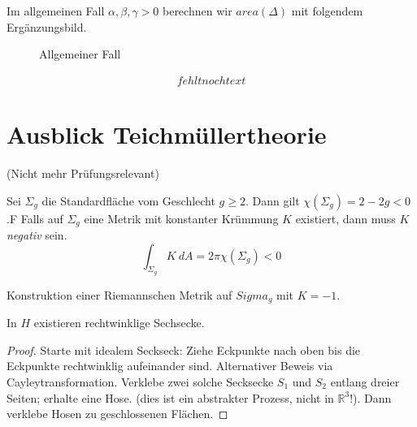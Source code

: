 \documentclass[../main.tex]{subfiles}
\begin{document}
Im allgemeinen Fall $\alpha, \beta, \gamma >0$ berechnen wir $area(\Delta)$ mit folgendem Ergänzungsbild.

\begin{figure}[htb]
    \centering
    \def\svgwidth{35em}
    
    \caption*{Allgemeiner Fall}        
\end{figure}

\begin{align*}
    fehlt noch text
\end{align*}

\section{Ausblick Teichmüllertheorie}
(Nicht mehr Prüfungsrelevant)
\begin{recall}
    Sei $\Sigma _g$ die Standardfläche vom Geschlecht $g \ge 2$. Dann gilt $\chi (\Sigma _g)=2 -2g <0$.F
    Falls auf $\Sigma _g$ eine Metrik mit konstanter Krümmung $K$ existiert, dann muss $K$ \emph{negativ} sein.
    $$\int _{\Sigma _g}K \ dA = 2 \pi \chi(\Sigma _g) < 0$$
\end{recall}
Konstruktion einer Riemannschen Metrik auf $Sigma _g$ mit $K= -1$.
\begin{lemma}
    In $H$ existieren rechtwinklige Sechsecke.
\end{lemma}
\begin{proof}
    Starte mit idealem Seckseck: Ziehe Eckpunkte nach oben bis die Eckpunkte
    rechtwinklig aufeinander sind.
    Alternativer Beweis via Cayleytransformation.
    Verklebe zwei solche Secksecke $S_1$ und $S_2$ entlang dreier Seiten; erhalte eine
    Hose. (dies ist ein abstrakter Prozess, nicht in $\mathbb{R}^3$!).
    Dann verklebe Hosen zu geschlossenen Flächen.
\end{proof}
\end{document}
